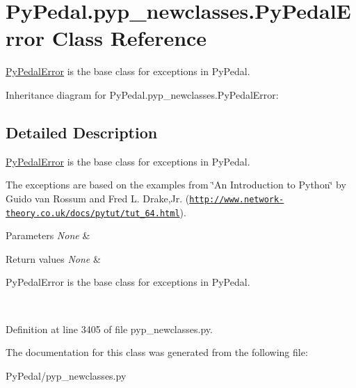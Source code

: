 \hypertarget{classPyPedal_1_1pyp__newclasses_1_1PyPedalError}{
\section{PyPedal.pyp\_\-newclasses.PyPedalError Class Reference}
\label{classPyPedal_1_1pyp__newclasses_1_1PyPedalError}
}


\hyperlink{classPyPedal_1_1pyp__newclasses_1_1PyPedalError}{PyPedalError} is the base class for exceptions in PyPedal.  




Inheritance diagram for PyPedal.pyp\_\-newclasses.PyPedalError:


\subsection{Detailed Description}
\hyperlink{classPyPedal_1_1pyp__newclasses_1_1PyPedalError}{PyPedalError} is the base class for exceptions in PyPedal. 

The exceptions are based on the examples from \char`\"{}An Introduction to Python\char`\"{} by Guido van Rossum and Fred L. Drake,Jr. (\href{http://www.network-theory.co.uk/docs/pytut/tut_64.html}{\tt http://www.network-\/theory.co.uk/docs/pytut/tut\_\-64.html}). 
\begin{DoxyParams}{Parameters}
{\em None} & \\
\hline
\end{DoxyParams}

\begin{DoxyRetVals}{Return values}
{\em None} & \begin{DoxyVerb}PyPedalError is the base class for exceptions in PyPedal.\end{DoxyVerb}
 \\
\hline
\end{DoxyRetVals}


Definition at line 3405 of file pyp\_\-newclasses.py.



The documentation for this class was generated from the following file:\begin{DoxyCompactItemize}
\item 
PyPedal/pyp\_\-newclasses.py\end{DoxyCompactItemize}
